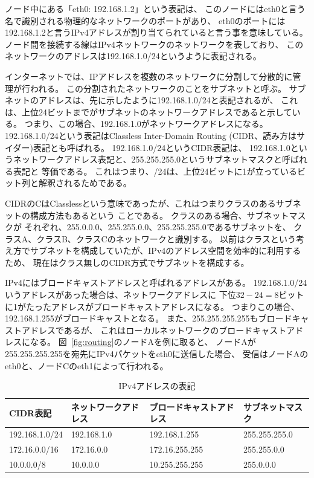 ノード中にある「eth0: 192.168.1.2」という表記は、
このノードにはeth0と言う名で識別される物理的なネットワークのポートがあり、
eth0のポートには192.168.1.2と言うIPv4アドレスが割り当てられていると言う事を意味している。
ノード間を接続する線はIPv4ネットワークのネットワークを表しており、
このネットワークのアドレスは192.168.1.0/24というように表記される。

インターネットでは、IPアドレスを複数のネットワークに分割して分散的に管理が行われる。
この分割されたネットワークのことをサブネットと呼ぶ。
サブネットのアドレスは、先に示したように192.168.1.0/24と表記されるが、
これは、上位24ビットまでがサブネットのネットワークアドレスであると示している。
つまり、この場合、192.168.1.0がネットワークアドレスになる。
192.168.1.0/24という表記はClassless Inter-Domain Routing (CIDR、読み方はサイダー)表記とも呼ばれる。
192.168.1.0/24というCIDR表記は、
192.168.1.0というネットワークアドレス表記と、255.255.255.0というサブネットマスクと呼ばれる表記と
等価である。
これはつまり、/24は、上位24ビットに1が立っているビット列と解釈されるためである。

CIDRのCはClasslessという意味であったが、これはつまりクラスのあるサブネットの構成方法もあるという
ことである。
クラスのある場合、サブネットマスクが
それぞれ、255.0.0.0、255.255.0.0、255.255.255.0であるサブネットを、
クラスA、クラスB、クラスCのネットワークと識別する。
以前はクラスという考え方でサブネットを構成していたが、IPv4のアドレス空間を効率的に利用するため、
現在はクラス無しのCIDR方式でサブネットを構成する。

IPv4にはブロードキャストアドレスと呼ばれるアドレスがある。
192.168.1.0/24いうアドレスがあった場合は、ネットワークアドレスに
下位$32-24=8$ビットに1がたったアドレスがブロードキャストアドレスになる。
つまりこの場合、192.168.1.255がブロードキャストとなる。
また、255.255.255.255もブロードキャストアドレスであるが、
これはローカルネットワークのブロードキャストアドレスになる。
図~\ref{fig:routing}のノードAを例に取ると、
ノードAが255.255.255.255を宛先にIPv4パケットをeth0に送信した場合、
受信はノードAのeth0と、ノードCのeth1によって行われる。

\begin{table}
    \centering
    \caption{IPv4アドレスの表記} \label{tab:ipv4addr}
    \begin{tabular}{llll}
        CIDR表記 & ネットワークアドレス & ブロードキャストアドレス & サブネットマスク \\ \hline
        192.168.1.0/24 & 192.168.1.0 & 192.168.1.255 & 255.255.255.0 \\
        172.16.0.0/16 & 172.16.0.0 & 172.16.255.255 & 255.255.0.0 \\
        10.0.0.0/8 & 10.0.0.0 & 10.255.255.255 & 255.0.0.0 \\
    \end{tabular}
\end{table}

